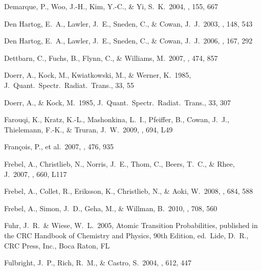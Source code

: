 \documentclass{emulateapj}
\begin{document}
\begin{thebibliography}{}
 Demarque, P., Woo, 
J.-H., Kim, Y.-C., \& Yi, S.~K.\ 2004, \apjs, 155, 667 

 Den Hartog, E.~A., 
Lawler, J.~E., Sneden, C., \& Cowan, J.~J.\ 2003, \apjs, 148, 543 

 Den Hartog, E.~A., 
Lawler, J.~E., Sneden, C., \& Cowan, J.~J.\ 2006, \apjs, 167, 292 

 Dettbarn, C., Fuchs, B., 
Flynn, C., \& Williams, M.\ 2007, \aap, 474, 857 


 Doerr, A., Kock, M., 
Kwiatkowski, M., \& Werner, K.\ 1985, J.\ Quant.\ Spectr.\ Radiat.\ Trans., 
33, 55 

 Doerr, A., \& Kock, M.\ 1985, 
J.\ Quant.\ Spectr.\ Radiat.\ Trans., 33, 307 


 Farouqi, K., Kratz, 
K.-L., Mashonkina, L.~I., Pfeiffer, B., Cowan, J.~J., Thielemann, F.-K., 
\& Truran, J.~W.\ 2009, \apjl, 694, L49 

 Fran{\c c}ois, P., 
et al.\ 2007, \aap, 476, 935 

 Frebel, A., Christlieb, 
N., Norris, J.~E., Thom, C., Beers, T.~C., \& Rhee, J.\ 2007, \apjl, 660, 
L117 

 Frebel, A., Collet, R., 
Eriksson, K., Christlieb, N., \& Aoki, W.\ 2008, \apj, 684, 588 

 Frebel, A., Simon, 
J.~D., Geha, M., \& Willman, B.\ 2010, \apj, 708, 560 

 Fuhr, J.~R.\ \& Wiese, W.~L.\ 2005,
Atomic Transition Probabilities, published in the CRC Handbook of Chemistry 
and Physics, 90th Edition, ed.\ Lide, D.~R., CRC Press, Inc., 
Boca Raton, FL

 Fulbright, J.~P., 
Rich, R.~M., \& Castro, S.\ 2004, \apj, 612, 447 


\end{thebibliography}
\end{document}
